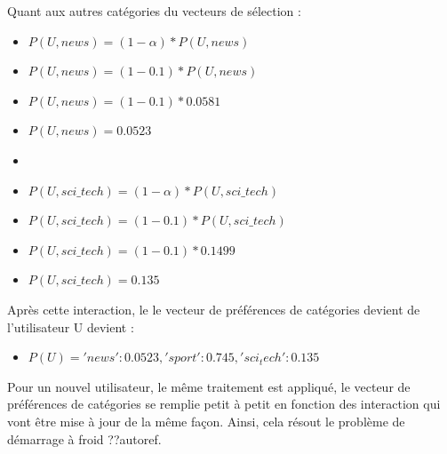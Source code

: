\begin{enumerate}[leftmargin=*]
            Quant aux autres catégories du vecteurs de sélection :
            \begin{itemize}[label={}]
                \item $P(U, news) = (1-{\alpha}) * {P(U, news)} $
                \item $P(U, news) = (1-{0.1}) * {P(U, news)} $
                \item $P(U, news) = (1-{0.1}) * {0.0581} $
                \item $P(U, news) = 0.0523$
                \item 
                \item $P(U, sci\_tech) = (1-{\alpha}) * {P(U, sci\_tech)} $
                \item $P(U, sci\_tech) = (1-{0.1}) * {P(U, sci\_tech)} $
                \item $P(U, sci\_tech) = (1-{0.1}) * {0.1499} $
                \item $P(U, sci\_tech) = 0.135$
            \end{itemize}
            Après cette interaction, le le vecteur de préférences de catégories devient de l'utilisateur U devient :
            \begin{itemize}[label={}]
                \item $P(U) = {'news': 0.0523, 'sport': 0.745, 'sci_tech': 0.135}$\\
            \end{itemize}
            Pour un nouvel utilisateur, le même traitement est appliqué, le vecteur de préférences de catégories se remplie petit à petit en fonction des interaction qui vont être mise à jour de la même façon. Ainsi, cela résout le problème de démarrage à froid ??autoref{}.
        \end{enumerate}

